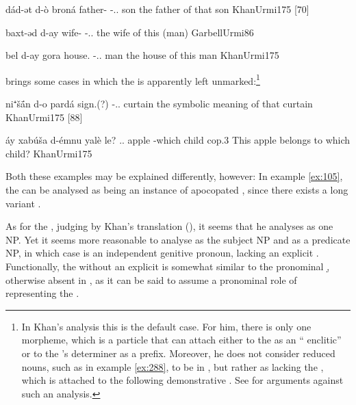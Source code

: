 {dád-ət d-ò broná}
{father-\cst{} \gen-\dem.\far.\sg{} son}
{the father of that son}
{KhanUrmi}{175 {[70]}}

{baxt-əd d-ay}
{wife-\cst{} \gen-\dem.\near.\masc}
{the wife of this (man)}
{GarbellUrmi}{86}


{bel d-ay gora}
{house.\cst{} \gen-\dem.\near.\masc{} man}
{the house of this man}
{KhanUrmi}{175}





\citet[175]{KhanUrmi} brings some cases in which the \prim is apparently left unmarked:\footnote{In Khan's analysis this is the default case. For him, there is only one  morpheme, which is a particle that can attach either to the \prim as an \enquote{ enclitic} or to the \secn's determiner as a prefix. Moreover, he does not consider reduced nouns, such as  in example \vref{ex:288}, to be in \cst*, but rather as lacking the , which is attached to the following demonstrative \citep[174--175]{KhanUrmi}. See  for  arguments against such an analysis.} 

{ni⁺šā́n d-o pardá}
{sign.(\cst?) \gen-\dem.\far.\sg{} curtain}
{the symbolic meaning of that curtain}
{KhanUrmi}{175 {[88]}}



{áy xabúša d-émnu yalè \cb{}le?}
{\dem.\near.\sg{} apple \gen-which child \cb{}cop.3\masc}
{This apple belongs to which child?}
{KhanUrmi}{175}

Both these examples may be explained differently, however: In example \ref{ex:105}, the \prim {} can be analysed as being an instance of apocopated \cst*, since there exists a long variant . 

As for the , judging by Khan's translation (), it seems that he analyses  as one NP. Yet it seems more reasonable to analyse  as the subject NP and  as a predicate NP, in which case  is an independent genitive pronoun, lacking an explicit \prim. Functionally, the  without an explicit \prim is somewhat similar to the pronominal \lnk* \d, otherwise absent in \JUrm, as it can be said to assume a pronominal role of representing the \prim.

